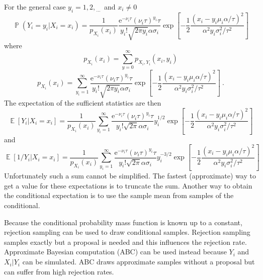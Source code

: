 \documentclass[12pt]{report}
\DeclareMathOperator{\expectation}{\mathbb{E}}
\DeclareMathOperator{\prob}{\mathbb{P}}
\newcommand{\euler}{\mathrm{e}}
\newcommand{\dotdotdot}{_{\phantom{.}\cdots}}
\begin{document}
For the general case $y_i=1,2,\dotdotdot$ and $x_i\neq0$
\begin{equation}
\prob\left(Y_i=y_i|X_i=x_i\right)=\frac{1}{p_{X_i}(x_i)}\dfrac{\euler^{-\nu_i\tau}(\nu_i\tau)^{y_i}\tau}{y_i!\sqrt{2\pi y_i}\alpha\sigma_i}
\exp\left[-\dfrac{1}{2}\dfrac{\left(x_i-y_i\mu_i\alpha/\tau\right)^2}{\alpha^2y_i\sigma_i^2/\tau^2}\right]
\end{equation}
where
\begin{equation}
p_{X_i}(x_i)=\sum_{y=0}^{\infty}p_{X_i,Y_i}(x_i,y_i)
\end{equation}
\begin{equation}
p_{X_i}(x_i)=\sum_{y_i=1}^{\infty}\dfrac{\euler^{-\nu_i\tau}(\nu_i\tau)^{y_i}\tau}{y_i!\sqrt{2\pi y_i}\alpha\sigma_i}
\exp\left[-\dfrac{1}{2}\dfrac{\left(x_i-y_i\mu_i\alpha/\tau\right)^2}{\alpha^2y_i\sigma_i^2/\tau^2}\right] \ .
\end{equation}
The expectation of the sufficient statistics are then
\begin{equation}
\expectation\left[Y_i|X_i=x_i\right]=
\frac{1}{p_{X_i}(x_i)}
\sum_{y_i=1}^{\infty}\dfrac{\euler^{-\nu_i\tau}(\nu_i\tau)^{y_i}\tau}{y_i!\sqrt{2\pi}\alpha\sigma_i}y_i^{1/2}
\exp\left[-\dfrac{1}{2}\dfrac{\left(x_i-y_i\mu_i\alpha/\tau\right)^2}{\alpha^2y_i\sigma_i^2/\tau^2}\right]
\end{equation}
and
\begin{equation}
\expectation\left[1/Y_i|X_i=x_i\right]=
\frac{1}{p_{X_i}(x_i)}
\sum_{y_i=1}^{\infty}\dfrac{\euler^{-\nu_i\tau}(\nu_i\tau)^{y_i}\tau}{y_i!\sqrt{2\pi}\alpha\sigma_i}y_i^{-3/2}
\exp\left[-\dfrac{1}{2}\dfrac{\left(x_i-y_i\mu_i\alpha/\tau\right)^2}{\alpha^2y_i\sigma_i^2/\tau^2}\right]
\end{equation}
Unfortunately such a sum cannot be simplified. The fastest (approximate) way to get a value for these expectations is to truncate the sum. Another way to obtain the conditional expectation is to use the sample mean from samples of the conditional.

Because the conditional probability mass function is known up to a constant, rejection sampling can be used to draw conditional samples. Rejection sampling samples exactly but a proposal is needed and this influences the rejection rate. Approximate Bayesian computation (ABC) can be used instead because $Y_i$ and $X_i|Y_i$ can be simulated. ABC draws approximate samples without a proposal but can suffer from high rejection rates.
\end{document}
